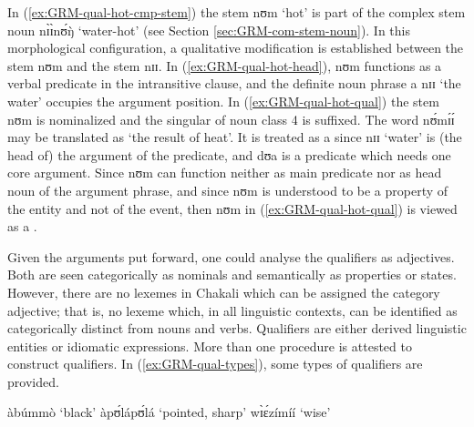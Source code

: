 \begin{exe}
\begin{exe}
\begin{exe}
\begin{exe}
\begin{exe}
\begin{exe}
\begin{exe}
\begin{exe}
\begin{exe}
 
In (\ref{ex:GRM-qual-hot-cmp-stem}) the stem {\sls nʊm} `hot' is part of the complex stem noun {\sls nɪ̀ɪ̀nʊ́ŋ̀} `water-hot' (see Section \ref{sec:GRM-com-stem-noun}).  In this morphological configuration, a qualitative modification is  established  between the stem {\sls nʊm} and the stem {\sls nɪɪ}. In (\ref{ex:GRM-qual-hot-head}), {\sls nʊm}  functions as a verbal predicate in the intransitive clause, and the definite noun phrase {\sls a nɪɪ} `the water' occupies the argument position. In (\ref{ex:GRM-qual-hot-qual}) the stem {\sls nʊm} is nominalized and the singular of  noun class 4 is suffixed. The word {\sls nʊ́mɪ́ɪ́} may be translated as  `the result of heat'. It is treated as a  since {\sls nɪɪ} `water' is  (the head of) the argument of the predicate, and {\sls dʊa} is a predicate which needs   one core argument. Since {\sls nʊm}  can function neither as main predicate nor as head noun of the argument phrase, and since {\sls nʊm}  is understood to be a property of the entity and not of the event, then {\sls nʊm} in (\ref{ex:GRM-qual-hot-qual}) is viewed as a .


Given the arguments put forward, one could analyse the qualifiers as adjectives. Both are  seen  categorically as nominals  and semantically as properties or states.  However, there are no lexemes in Chakali  which can be assigned the category adjective; that is, no lexeme which, in all  linguistic contexts, can be identified as categorically distinct from nouns and verbs.  Qualifiers are either derived linguistic entities or idiomatic expressions. More than one procedure is attested to construct qualifiers. In (\ref{ex:GRM-qual-types}),   some types of qualifiers are provided.

\ea\label{ex:GRM-qual-types}
 
 \ea\label{ex:GRM-qual-t0} àbúmmò  {\rm `black'}
  \ex\label{ex:GRM-qual-t1} àpʊ́lápʊ́lá {\rm  `pointed, sharp'}
  \ex\label{ex:GRM-qual-t2}  wɪ̀ɛ́zímíí  {\rm  `wise'} 

\z 
 \z


\end{exe}
\end{exe}
\end{exe}
\end{exe}
\end{exe}
\end{exe}
\end{exe}
\end{exe}
\end{exe}
